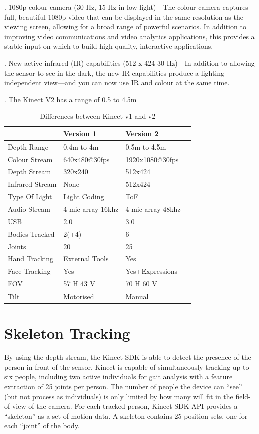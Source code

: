 . 1080p colour camera (30 Hz, 15 Hz in low light) - The colour camera captures full, beautiful 1080p video that can be displayed in the same resolution as the viewing screen, allowing for a broad range of powerful scenarios. In addition to improving video communications and video analytics applications, this provides a stable input on which to build high quality, interactive applications.

. New active infrared (IR) capabilities (512 x 424 30 Hz) - In addition to allowing the sensor to see in the dark, the new IR capabilities produce a lighting-independent view—and you can now use IR and colour at the same time.

. The Kinect V2 has a range of 0.5 to 4.5m

\def\arraystretch{1.7}
\begin{table}

\begin{tabular}{ |p{4cm}||p{5cm}|p{5cm}|p{5cm}| }
 \hline
 \cellcolor{pink} & \cellcolor{pink} Version 1  &  \cellcolor{pink} Version 2 \\
 \hline
Depth Range  & 0.4m to 4m  & 0.5m to 4.5m  \\
Colour Stream & 640x480@30fps & 1920x1080@30fps \\
Depth Stream  & 320x240  & 512x424  \\
Infrared Stream & None & 512x424  \\
Type Of Light  & Light Coding  & ToF  \\
Audio Stream & 4-mic array 16khz & 4-mic array 48khz \\
USB  & 2.0  & 3.0  \\
Bodies Tracked  & 2(+4) & 6  \\
Joints & 20 & 25 \\
Hand Tracking & External Tools  & Yes  \\
Face Tracking  & Yes  & Yes+Expressions  \\
FOV & 57$^{\circ}$H 43$^{\circ}$V & 70$^{\circ}$H 60$^{\circ}$V \\
Tilt  & Motorised  & Manual  \\
\hline
\end{tabular}
\caption{Differences between Kinect v1 and v2}
\end{table}

\newpage





\section{Skeleton Tracking} \label{Skeleton Tracking} 
\noindent By using the depth stream, the Kinect SDK is able to detect the presence of the person in front of the sensor. Kinect is capable of simultaneously tracking up to six people, including two active individuals for gait analysis with a feature extraction of 25 joints per person. The number of people the device can “see” (but not process as individuals) is only limited by how many will fit in the field-of-view of the camera. For each tracked person, Kinect SDK API provides a “skeleton” as a set of motion data. A skeleton contains 25 position sets, one for each “joint” of the body.

